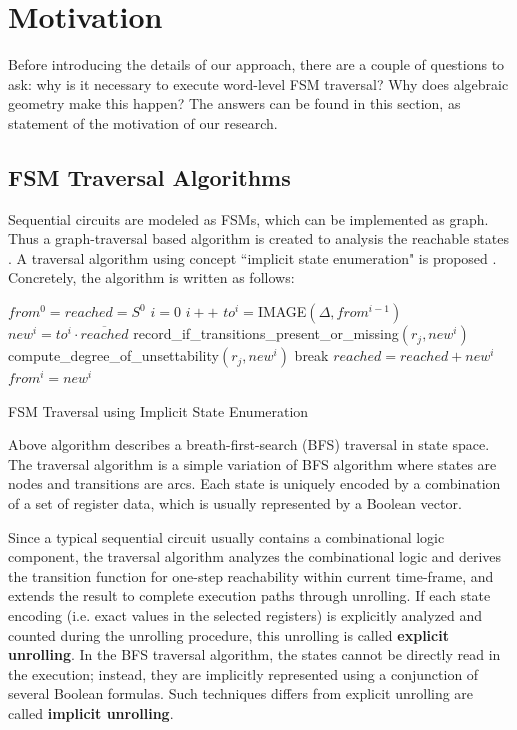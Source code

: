 \section{Motivation}
Before introducing the details of our approach, there are a couple of questions to ask: why is it
necessary to execute word-level FSM traversal? Why does algebraic geometry make this happen?
The answers can be found in this section, as statement of the motivation of our research.

\subsection{FSM Traversal Algorithms}
Sequential circuits are modeled as FSMs, which can be implemented as graph. Thus a 
graph-traversal based algorithm is created to analysis the reachable states \cite{coudert2003unified}.
A traversal algorithm using concept ``implicit state enumeration" is proposed \cite{cho1993redundancy}.
Concretely, the algorithm is written as follows:

\begin{algorithm}[H]
\SetAlgoNoLine
\LinesNumbered

  $from^0 = reached = S^0$\;
  $i = 0$\;
  {
  	$i++$\;
	$to^i = $IMAGE$(\Delta,from^{i-1})$\;
	$new^i = to^i \cdot \overline{reached}$\;
	{
		record\_if\_transitions\_present\_or\_missing$(r_j,new^i)$\;
		compute\_degree\_of\_unsettability$(r_j,new^i)$\;
	}
	{
		break\;
	}
	$reached = reached + new^i$\;
	$from^i = new^i$\;
  }\
\caption {FSM Traversal using Implicit State Enumeration\cite{KallaPartialScan}}
\label{alg:SIMPSON}
\end{algorithm}
\DecMargin{1em}

Above algorithm describes a breath-first-search (BFS) traversal in
state space. The traversal algorithm is a simple variation of BFS algorithm where 
states are nodes and transitions are arcs. Each state is uniquely encoded by a combination
of a set of register data, which is usually represented by a Boolean vector. 

Since a typical sequential circuit usually contains a combinational logic
component, the traversal algorithm analyzes the combinational logic and derives the transition 
function for one-step reachability within current time-frame, and extends the result to complete 
execution paths through unrolling. If each state encoding (i.e. exact values in the selected registers) is
explicitly analyzed and counted during the unrolling 
procedure, this unrolling is called {\bf explicit unrolling}. In the BFS traversal algorithm, the states cannot be 
directly read in the execution; instead, they are implicitly represented using a conjunction of several 
Boolean formulas. Such techniques differs from explicit unrolling are called {\bf implicit unrolling}.

